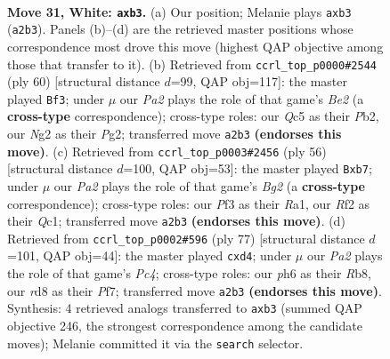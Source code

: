 \documentclass[11pt]{article}
\begin{document}
\clearpage

\begin{figure}[p]\centering
\begin{subfigure}{0.46\textwidth}\centering
\resizebox{\linewidth}{!}{%
\newchessgame
\chessboard[
  setfen={nr1r2k1/5pb1/p5qp/2Q1p3/4P2n/1p1P1P2/PP1B1RN1/RN4K1 w - - 0 31},
  showmover=false,
  pgfstyle=straightmove, color=movearrow, markmove={a2-b3}
]}
\caption{}
\end{subfigure}\hfill
\begin{subfigure}{0.46\textwidth}\centering
\resizebox{\linewidth}{!}{%
\newchessgame
\chessboard[
  setfen={r1r2k2/4pp2/p2p4/1b1P1PQ1/4q1pP/1N2n3/1P2B1P1/R3R2K w - - 1 31},
  showmover=false,
  pgfstyle=straightmove, color=movearrow, markmove={e2-f3}
]}
\caption{}
\end{subfigure}
\\[4pt]
\begin{subfigure}{0.46\textwidth}\centering
\resizebox{\linewidth}{!}{%
\newchessgame
\chessboard[
  setfen={2b1rbk1/Br3p2/5n1p/1p2p1p1/2q3P1/2N4P/4PPB1/RRQ3K1 w - - 4 29},
  showmover=false,
  pgfstyle=straightmove, color=movearrow, markmove={g2-b7}
]}
\caption{}
\end{subfigure}\hfill
\begin{subfigure}{0.46\textwidth}\centering
\resizebox{\linewidth}{!}{%
\newchessgame
\chessboard[
  setfen={1r4k1/5pp1/3pq1np/2p2N2/3PP3/6PP/brB1RP2/R2Q2K1 b - - 1 39},
  showmover=false,
  pgfstyle=straightmove, color=movearrow, markmove={c5-d4}
]}
\caption{}
\end{subfigure}
\caption{\textbf{Move 31, White: \texttt{axb3}.} (a) Our position; Melanie plays \texttt{axb3} (\texttt{a2b3}). Panels (b)--(d) are the retrieved master positions whose correspondence most drove this move (highest QAP objective among those that transfer to it). (b) Retrieved from \texttt{ccrl\_top\_p0000\#2544} (ply 60) [structural distance $d$=99, QAP obj=117]: the master played \texttt{Bf3}; under $\mu$ our \emph{Pa2} plays the role of that game's \emph{Be2} (a \textbf{cross-type} correspondence); cross-type roles: our \emph{Q}c5 as their \emph{P}b2, our \emph{N}g2 as their \emph{P}g2; transferred move \texttt{a2b3} \textbf{(endorses this move)}. (c) Retrieved from \texttt{ccrl\_top\_p0003\#2456} (ply 56) [structural distance $d$=100, QAP obj=53]: the master played \texttt{Bxb7}; under $\mu$ our \emph{Pa2} plays the role of that game's \emph{Bg2} (a \textbf{cross-type} correspondence); cross-type roles: our \emph{P}f3 as their \emph{R}a1, our \emph{R}f2 as their \emph{Q}c1; transferred move \texttt{a2b3} \textbf{(endorses this move)}. (d) Retrieved from \texttt{ccrl\_top\_p0002\#596} (ply 77) [structural distance $d$=101, QAP obj=44]: the master played \texttt{cxd4}; under $\mu$ our \emph{Pa2} plays the role of that game's \emph{Pc4}; cross-type roles: our \emph{p}h6 as their \emph{R}b8, our \emph{r}d8 as their \emph{P}f7; transferred move \texttt{a2b3} \textbf{(endorses this move)}. Synthesis: 4 retrieved analogs transferred to \texttt{axb3} (summed QAP objective 246, the strongest correspondence among the candidate moves); Melanie committed it via the \texttt{search} selector.}
\label{fig:thought-m60}
\end{figure}
\end{document}
